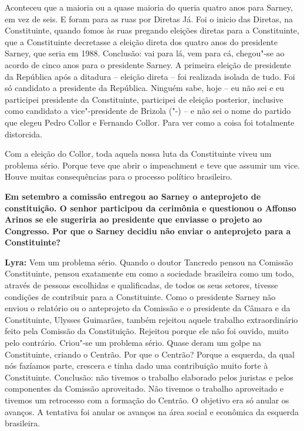 Aconteceu que a maioria ou a quase maioria do  queria quatro anos
para Sarney, em vez de seis. E foram para as ruas por Diretas Já. Foi o
inicio das Diretas, na Constituinte, quando fomos às ruas pregando
eleições diretas para a Constituinte, que a Constituinte decretasse a
eleição direta dos quatro anos do presidente Sarney, que seria em 1988.
Conclusão: vai para lá, vem para cá, chegou"-se ao acordo de cinco anos
para o presidente Sarney. A primeira eleição de presidente da República
após a ditadura -- eleição direta -- foi realizada isolada de tudo. Foi
só candidato a presidente da República. Ninguém sabe, hoje -- eu não sei
e eu participei presidente da Constituinte, participei de eleição
posterior, inclusive como candidato a vice"-presidente de Brizola
("-) -- e não sei o nome do partido que elegeu Pedro Collor e
Fernando Collor. Para ver como a coisa foi totalmente distorcida.

Com a eleição do Collor, toda aquela nossa luta da Constituinte viveu um
problema sério. Porque teve que abrir o impeachment e teve que assumir
um vice. Houve muitas consequências para o processo político brasileiro.

\textbf{Em setembro a comissão entregou ao Sarney o anteprojeto de
constituição. O senhor participou da cerimônia e questionou o Affonso
Arinos se ele sugeriria ao presidente que enviasse o projeto ao
Congresso. Por que o Sarney decidiu não enviar o anteprojeto para a
Constituinte?}

\textbf{Lyra:} Vem um problema sério. Quando o doutor Tancredo pensou na
Comissão Constituinte, pensou exatamente em como a sociedade brasileira
como um todo, através de pessoas escolhidas e qualificadas, de todos os
seus setores, tivesse condições de contribuir para a Constituinte. Como
o presidente Sarney não enviou o relatório ou o anteprojeto da Comissão
e o presidente da Câmara e da Constituinte, Ulysses Guimarães, também
rejeitou aquele trabalho extraordinário feito pela Comissão da
Constituição. Rejeitou porque ele não foi ouvido, muito pelo contrário.
Criou"-se um problema sério. Quase deram um golpe na Constituinte,
criando o Centrão. Por que o Centrão? Porque a esquerda, da qual nós
fazíamos parte, crescera e tinha dado uma contribuição muito forte à
Constituinte. Conclusão: não tivemos o trabalho elaborado pelos juristas
e pelos componentes da Comissão aproveitado. Não tivemos o trabalho
aproveitado e tivemos um retrocesso com a formação do Centrão. O
objetivo era só anular os avanços. A tentativa foi anular os avanços na
área social e econômica da esquerda brasileira.


